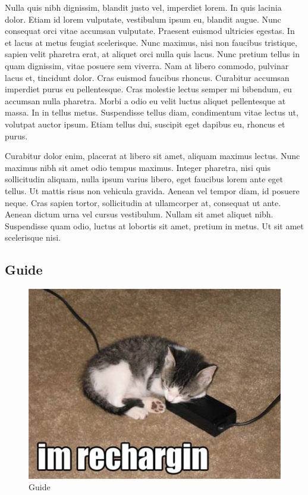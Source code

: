 		Nulla quis nibh dignissim, blandit justo vel, imperdiet lorem. In quis lacinia dolor. Etiam id lorem vulputate, vestibulum ipsum eu, blandit augue. Nunc consequat orci vitae accumsan vulputate. Praesent euismod ultricies egestas. In et lacus at metus feugiat scelerisque. Nunc maximus, nisi non faucibus tristique, sapien velit pharetra erat, at aliquet orci nulla quis lacus. Nunc pretium tellus in quam dignissim, vitae posuere sem viverra. Nam at libero commodo, pulvinar lacus et, tincidunt dolor. Cras euismod faucibus rhoncus. Curabitur accumsan imperdiet purus eu pellentesque. Cras molestie lectus semper mi bibendum, eu accumsan nulla pharetra. Morbi a odio eu velit luctus aliquet pellentesque at massa. In in tellus metus. Suspendisse tellus diam, condimentum vitae lectus ut, volutpat auctor ipsum. Etiam tellus dui, suscipit eget dapibus eu, rhoncus et purus.

		Curabitur dolor enim, placerat at libero sit amet, aliquam maximus lectus. Nunc maximus nibh sit amet odio tempus maximus. Integer pharetra, nisi quis sollicitudin aliquam, nulla ipsum varius libero, eget faucibus lorem ante eget tellus. Ut mattis risus non vehicula gravida. Aenean vel tempor diam, id posuere neque. Cras sapien tortor, sollicitudin at ullamcorper at, consequat ut ante. Aenean dictum urna vel cursus vestibulum. Nullam sit amet aliquet nibh. Suspendisse quam odio, luctus at lobortis sit amet, pretium in metus. Ut sit amet scelerisque nisi. 

	\subsection{Guide}
		\begin{figure}
			\begin{center}
				\includegraphics[width=1\textwidth]{figure/guide.jpg}
			\end{center}
			\caption{Guide}
			\label{fig:guide}
		\end{figure}

